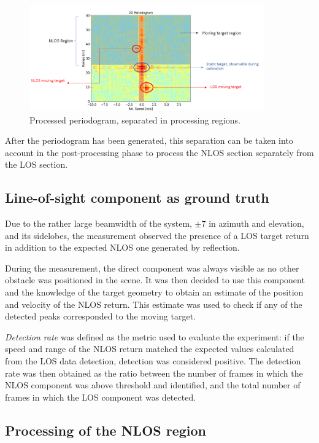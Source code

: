 \begin{figure}[H]
	\centering
	\includegraphics[width=0.9\textwidth]{Images/Test1/nlos-los-separation.png}
	\caption{Processed periodogram, separated in processing regions.}
	\label{fig:Test1_nlos_los_separation}
\end{figure}


After the periodogram has been generated, this separation can be taken into account in the post-processing phase to process the NLOS section separately from the LOS section.

\subsection{Line-of-sight component as ground truth}

Due to the rather large beamwidth of the system, $\pm$7\textdegree\hspace{1pt} in azimuth and elevation, and its sidelobes, the measurement observed the presence of a LOS target return in addition to the expected NLOS one generated by reflection.

During the measurement, the direct component was always visible as no other obstacle was positioned in the scene. It was then decided to use this component and the knowledge of the target geometry to obtain an estimate of the position and velocity of the NLOS return. This estimate was used to check if any of the detected peaks corresponded to the moving target.

\textit{Detection rate} was defined as the metric used to evaluate the experiment: if the speed and range of the NLOS return matched the expected values calculated from the LOS data detection, detection was considered positive.
The detection rate was then obtained as the ratio between the number of frames in which the NLOS component was above threshold and identified, and the total number of frames in which the LOS component was detected.

\subsection{Processing of the NLOS region}

